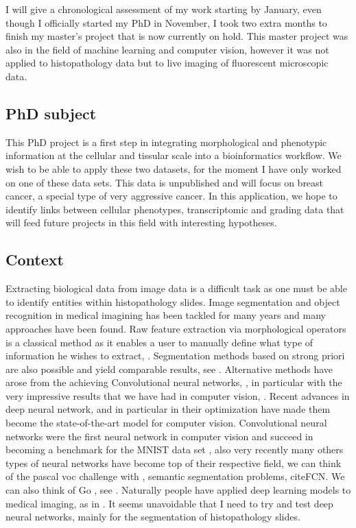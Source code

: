 \documentclass[a4paper,10pt]{article}
\begin{document}
 I will give a chronological assessment of my work starting by January, even though I officially started my PhD in November, I took two extra months to finish my master's project that is now currently on hold. This master project was also in the field of machine learning and computer vision, however it was not applied to histopathology data but to live imaging of fluorescent microscopic data. 


\subsection*{PhD subject}

This  PhD  project is a first step in integrating morphological and phenotypic information at the cellular and tissular scale into a bioinformatics workflow. We wish to be able to apply these two datasets, for the moment I have only worked on one of these data sets. This data is unpublished and will focus on breast cancer, a special type of very aggressive cancer. In this application, we hope to identify links between cellular phenotypes, transcriptomic and grading data that will feed future projects in this field with interesting hypotheses. 

\subsection*{Context}


Extracting biological data from image data is a difficult task as one must be able to identify entities within histopathology slides. Image segmentation and object recognition in medical imagining has been tackled for many years and many approaches have been found. Raw feature extraction via morphological operators is a classical method as it enables a user to manually define what type of information he wishes to extract, \cite{irshad2014methods}. Segmentation methods based on strong priori are also possible and yield comparable results, see \cite{ranefall2016fast}. Alternative methods have arose from the achieving Convolutional neural networks, \cite{lecun}, in particular with the very impressive results that we have had in computer vision, \cite{ImageNet}. Recent advances in deep neural network, and in particular in their optimization have made them become the state-of-the-art model for computer vision. Convolutional neural networks were the first neural network in computer vision and succeed in becoming a benchmark for the MNIST data set \cite{lecun}, also very recently many others types of neural networks have become top of their respective field, we can think of the pascal voc challenge with \cite{ImageNet}, semantic segmentation problems, cite{FCN}. We can also think of Go 
, see \cite{AlphaGo}. Naturally people have applied deep learning models to medical imaging, as in \cite{UNet}. It seems unavoidable that I need to try and test deep neural networks, mainly for the segmentation of histopathology slides.
\end{document}
